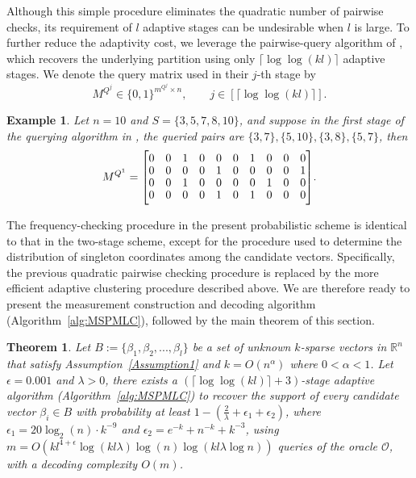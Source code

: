 \documentclass[10pt,a4paper]{amsart}
\newcommand\mc{\mathcal}
\newtheorem{theorem}{Theorem}[section]
\newtheorem{example}{Example}[section]
\begin{document}
Although this simple procedure eliminates the quadratic number of pairwise checks, its requirement of $l$ adaptive stages can be undesirable when $l$ is large. To further reduce the adaptivity cost, we leverage the pairwise-query algorithm of \cite[Theorem~1.1]{black2025learning}, which recovers the underlying partition using only $\lceil\log\log(kl)\rceil$ adaptive stages. We denote the query matrix used in their $j$-th stage by
\[
M^{Q^j}\in\{0,1\}^{m^{Q^j}\times n},
\qquad j\in[\lceil\log\log(kl)\rceil].
\]

\begin{example}\label{exp5.1}
    Let $n=10$ and $S=\{3,5,7,8,10\}$, and suppose in the first stage of the querying algorithm in \cite[Theorem~1.1]{black2025learning}, the queried pairs are $\{3,7\},\{5,10\},\{3,8\},\{5,7\}$, then 
    \[M^{Q^1}={
   \renewcommand{\arraystretch}{0.9}
   \begin{bmatrix}
        0 & 0 & 1 & 0 & 0 & 0 & 1 & 0 & 0 & 0 \\
        0 & 0 & 0 & 0 & 1 & 0 & 0 & 0 & 0 & 1 \\
        0 & 0 & 1 & 0 & 0 & 0 & 0 & 1 & 0 & 0 \\
        0 & 0 & 0 & 0 & 1 & 0 & 1 & 0 & 0 & 0 
    \end{bmatrix}}.
    \]
\end{example}

The frequency-checking procedure in the present probabilistic scheme is identical to that in the two-stage scheme, except for the procedure used to determine the distribution of singleton coordinates among the candidate vectors. Specifically, the previous quadratic pairwise checking procedure is replaced by the more efficient adaptive clustering procedure described above. We are therefore ready to present the measurement construction and decoding algorithm (Algorithm~\ref{alg:MSPMLC}), followed by the main theorem of this section.

\begin{theorem}\label{thm2}
    Let $B:=\{\beta_1,\beta_2,...,\beta_l\}$ be a set of unknown $k$-sparse vectors in $\mathbb{R}^n$ that satisfy Assumption~\ref{Assumption1} and $k=O(n^\alpha)$ where $0<\alpha<1$. Let $\epsilon=0.001$ and $\lambda>0$, there exists a $(\lceil\log\log (kl)\rceil+3)$-stage adaptive algorithm (Algorithm~\ref{alg:MSPMLC}) to recover the support of every candidate vector $\beta_i\in B$ with probability at least $1 - (\frac{2}{\lambda}+\epsilon_1+\epsilon_2)$, where $\epsilon_1=20\log_2(n)\cdot k^{-9}$ and $\epsilon_2=e^{-k}+n^{-k}+k^{-3}$, using $m=O(kl^{4+\epsilon}\log(kl\lambda)\log (n)\log (kl\lambda\log n))$ queries of the oracle $\mc{O}$, with a decoding complexity $O(m)$. 
\end{theorem}
\end{document}
